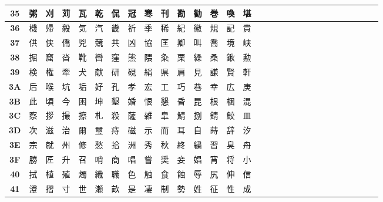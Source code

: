 \begin{table}[H]
\begin{tabular}{|Sc|Sc|Sc|Sc|Sc|Sc|Sc|Sc|Sc|Sc|Sc|Sc|Sc|Sc|Sc|}
\textbf{35} & 粥 & 刈 & 苅 & 瓦 & 乾 & 侃 & 冠 & 寒 & 刊 & 勘 & 勧 & 巻 & 喚 & 堪 \\ \hline
\textbf{36} & 機 & 帰 & 毅 & 気 & 汽 & 畿 & 祈 & 季 & 稀 & 紀 & 徽 & 規 & 記 & 貴 \\ \hline
\textbf{37} & 供 & 侠 & 僑 & 兇 & 競 & 共 & 凶 & 協 & 匡 & 卿 & 叫 & 喬 & 境 & 峡 \\ \hline
\textbf{38} & 掘 & 窟 & 沓 & 靴 & 轡 & 窪 & 熊 & 隈 & 粂 & 栗 & 繰 & 桑 & 鍬 & 勲 \\ \hline
\textbf{39} & 検 & 権 & 牽 & 犬 & 献 & 研 & 硯 & 絹 & 県 & 肩 & 見 & 謙 & 賢 & 軒 \\ \hline
\textbf{3A} & 后 & 喉 & 坑 & 垢 & 好 & 孔 & 孝 & 宏 & 工 & 巧 & 巷 & 幸 & 広 & 庚 \\ \hline
\textbf{3B} & 此 & 頃 & 今 & 困 & 坤 & 墾 & 婚 & 恨 & 懇 & 昏 & 昆 & 根 & 梱 & 混 \\ \hline
\textbf{3C} & 察 & 拶 & 撮 & 擦 & 札 & 殺 & 薩 & 雑 & 皐 & 鯖 & 捌 & 錆 & 鮫 & 皿 \\ \hline
\textbf{3D} & 次 & 滋 & 治 & 爾 & 璽 & 痔 & 磁 & 示 & 而 & 耳 & 自 & 蒔 & 辞 & 汐 \\ \hline
\textbf{3E} & 宗 & 就 & 州 & 修 & 愁 & 拾 & 洲 & 秀 & 秋 & 終 & 繍 & 習 & 臭 & 舟 \\ \hline
\textbf{3F} & 勝 & 匠 & 升 & 召 & 哨 & 商 & 唱 & 嘗 & 奨 & 妾 & 娼 & 宵 & 将 & 小 \\ \hline
\textbf{40} & 拭 & 植 & 殖 & 燭 & 織 & 職 & 色 & 触 & 食 & 蝕 & 辱 & 尻 & 伸 & 信 \\ \hline
\textbf{41} & 澄 & 摺 & 寸 & 世 & 瀬 & 畝 & 是 & 凄 & 制 & 勢 & 姓 & 征 & 性 & 成 \\ \hline
\end{tabular}
\end{table}

